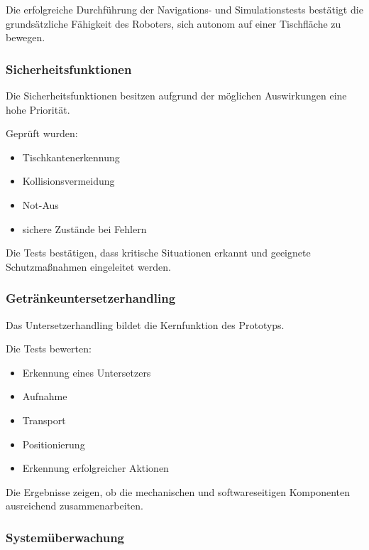 Die erfolgreiche Durchführung der Navigations- und Simulationstests
bestätigt die grundsätzliche Fähigkeit des Roboters, sich autonom auf
einer Tischfläche zu bewegen.

\subsubsection{Sicherheitsfunktionen}\label{sicherheitsfunktionen}

Die Sicherheitsfunktionen besitzen aufgrund der möglichen Auswirkungen
eine hohe Priorität.

Geprüft wurden:

\begin{itemize}
\tightlist
\item
  Tischkantenerkennung
\item
  Kollisionsvermeidung
\item
  Not-Aus
\item
  sichere Zustände bei Fehlern
\end{itemize}

Die Tests bestätigen, dass kritische Situationen erkannt und geeignete
Schutzmaßnahmen eingeleitet werden.

\subsubsection{Getränkeuntersetzerhandling}\label{getruxe4nkeuntersetzerhandling}

Das Untersetzerhandling bildet die Kernfunktion des Prototyps.

Die Tests bewerten:

\begin{itemize}
\tightlist
\item
  Erkennung eines Untersetzers
\item
  Aufnahme
\item
  Transport
\item
  Positionierung
\item
  Erkennung erfolgreicher Aktionen
\end{itemize}

Die Ergebnisse zeigen, ob die mechanischen und softwareseitigen
Komponenten ausreichend zusammenarbeiten.

\subsubsection{Systemüberwachung}\label{systemuxfcberwachung}

